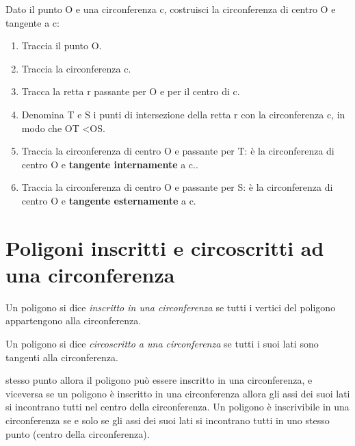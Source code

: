 \begin{procedura}
  Dato il punto O e una circonferenza c, costruisci la circonferenza di 
centro O e tangente a c:
  \begin{enumerate} [nosep]
    \item 
    Traccia il punto O.
    \item 
    Traccia la circonferenza c.
    \item 
    Tracca la retta  r  passante per O e per il centro di c.
    \item 
    Denomina T e S i punti di intersezione della retta  r con la 
circonferenza c, in modo che OT <OS.
    \item 
    Traccia la circonferenza di centro O e passante per T: è la 
circonferenza di centro O e \textbf{tangente internamente} a c..
    \item 
    Traccia la circonferenza di centro O e passante per S: è la 
circonferenza di centro O e \textbf{tangente esternamente} a c.
  \end{enumerate}
\end{procedura}


\section{Poligoni inscritti e circoscritti ad una 
circonferenza}\label{sect:poligoni_circonferenza}

\begin{definizione}
Un poligono si dice \emph{inscritto in una circonferenza} se tutti i 
vertici del poligono appartengono alla circonferenza.
\end{definizione}

\begin{definizione}
Un poligono si dice \emph{circoscritto a una circonferenza} se tutti 
i suoi lati sono tangenti alla circonferenza.
\end{definizione}


\begin{inaccessibleblock}
 \begin{figure}[htb]
  \centering
\end{figure}
\end{inaccessibleblock}

\begin{teorema}
stesso punto allora il poligono può essere inscritto in una 
circonferenza, e viceversa se un poligono è inscritto in una 
circonferenza allora gli assi dei suoi lati si incontrano tutti nel 
centro della circonferenza.
Un poligono è inscrivibile in una circonferenza se e solo se gli assi 
dei suoi lati si incontrano tutti in uno stesso punto (centro della 
circonferenza).
\end{teorema}


